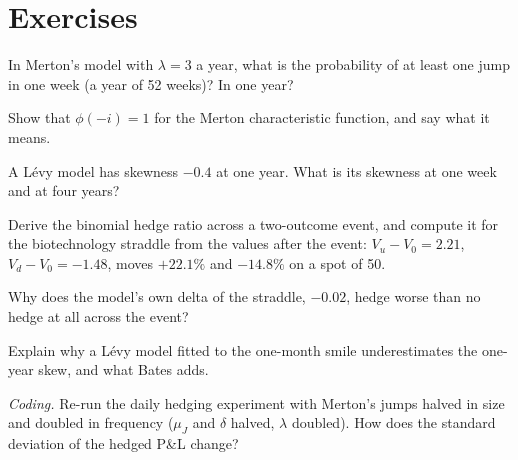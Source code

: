 \section{Exercises}

\begin{exercise}[$\star$]\label{exo:dv:jumps-and-levy-models:1}
In Merton's model with $\lambda=3$ a year, what is the probability of at least one jump in one week (a year of 52
weeks)? In one year?
\end{exercise}

\begin{exercise}[$\star$]\label{exo:dv:jumps-and-levy-models:2}
Show that $\phi(-i)=1$ for the Merton characteristic function, and say what it means.
\end{exercise}

\begin{exercise}[$\star$]\label{exo:dv:jumps-and-levy-models:3}
A Lévy model has skewness $-0.4$ at one year. What is its skewness at one week and at four years?
\end{exercise}

\begin{exercise}[$\star\star$]\label{exo:dv:jumps-and-levy-models:4}
Derive the binomial hedge ratio across a two-outcome event, and compute it for the biotechnology straddle from the
values after the event: $V_u-V_0=2.21$, $V_d-V_0=-1.48$, moves $+22.1\%$ and $-14.8\%$ on a spot of 50.
\end{exercise}

\begin{exercise}[$\star\star$]\label{exo:dv:jumps-and-levy-models:5}
Why does the model's own delta of the straddle, $-0.02$, hedge worse than no hedge at all across the event?
\end{exercise}

\begin{exercise}[$\star\star$]\label{exo:dv:jumps-and-levy-models:6}
Explain why a Lévy model fitted to the one-month smile underestimates the one-year skew, and what Bates adds.
\end{exercise}

\begin{exercise}[$\star\star\star$]\label{exo:dv:jumps-and-levy-models:7}
\emph{Coding.} Re-run the daily hedging experiment with Merton's jumps halved in size and doubled in frequency
($\mu_J$ and $\delta$ halved, $\lambda$ doubled). How does the standard deviation of the hedged P\&L change?
\end{exercise}

